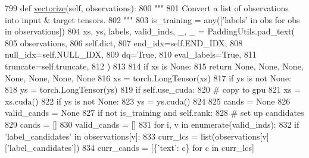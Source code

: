 \begin{DoxyCode}
799     \textcolor{keyword}{def }\hyperlink{namespaceparlai_1_1agents_1_1drqa_1_1utils_a5c76cc39e3014c7bcf9199d566dbdc0f}{vectorize}(self, observations):
800         \textcolor{stringliteral}{"""}
801 \textcolor{stringliteral}{        Convert a list of observations into input & target tensors.}
802 \textcolor{stringliteral}{        """}
803         is\_training = any([\textcolor{stringliteral}{'labels'} \textcolor{keywordflow}{in} obs \textcolor{keywordflow}{for} obs \textcolor{keywordflow}{in} observations])
804         xs, ys, labels, valid\_inds, \_, \_ = PaddingUtils.pad\_text(
805             observations,
806             self.dict,
807             end\_idx=self.END\_IDX,
808             null\_idx=self.NULL\_IDX,
809             dq=\textcolor{keyword}{True},
810             eval\_labels=\textcolor{keyword}{True},
811             truncate=self.truncate,
812         )
813 
814         \textcolor{keywordflow}{if} xs \textcolor{keywordflow}{is} \textcolor{keywordtype}{None}:
815             \textcolor{keywordflow}{return} \textcolor{keywordtype}{None}, \textcolor{keywordtype}{None}, \textcolor{keywordtype}{None}, \textcolor{keywordtype}{None}, \textcolor{keywordtype}{None}, \textcolor{keywordtype}{None}, \textcolor{keywordtype}{None}
816         xs = torch.LongTensor(xs)
817         \textcolor{keywordflow}{if} ys \textcolor{keywordflow}{is} \textcolor{keywordflow}{not} \textcolor{keywordtype}{None}:
818             ys = torch.LongTensor(ys)
819         \textcolor{keywordflow}{if} self.use\_cuda:
820             \textcolor{comment}{# copy to gpu}
821             xs = xs.cuda()
822             \textcolor{keywordflow}{if} ys \textcolor{keywordflow}{is} \textcolor{keywordflow}{not} \textcolor{keywordtype}{None}:
823                 ys = ys.cuda()
824 
825         cands = \textcolor{keywordtype}{None}
826         valid\_cands = \textcolor{keywordtype}{None}
827         \textcolor{keywordflow}{if} \textcolor{keywordflow}{not} is\_training \textcolor{keywordflow}{and} self.rank:
828             \textcolor{comment}{# set up candidates}
829             cands = []
830             valid\_cands = []
831             \textcolor{keywordflow}{for} i, v \textcolor{keywordflow}{in} enumerate(valid\_inds):
832                 \textcolor{keywordflow}{if} \textcolor{stringliteral}{'label\_candidates'} \textcolor{keywordflow}{in} observations[v]:
833                     curr\_lcs = list(observations[v][\textcolor{stringliteral}{'label\_candidates'}])
834                     curr\_cands = [\{\textcolor{stringliteral}{'text'}: c\} \textcolor{keywordflow}{for} c \textcolor{keywordflow}{in} curr\_lcs]

\end{DoxyCode}
